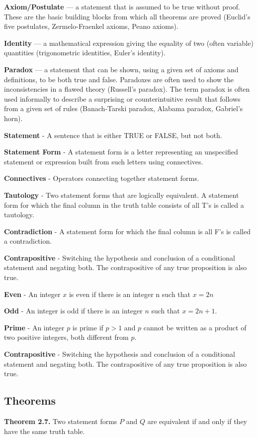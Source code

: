 \documentclass{article}
\begin{document}
\textbf{Axiom/Postulate} — a statement that is assumed to be true without proof. These are the basic building blocks from which all theorems are proved (Euclid’s five postulates, Zermelo-Fraenkel axioms, Peano axioms).

\textbf{Identity} — a mathematical expression giving the equality of two (often variable) quantities (trigonometric identities, Euler’s identity).

\textbf{Paradox} — a statement that can be shown, using a given set of axioms and definitions, to be both true and false. Paradoxes are often used to show the inconsistencies in a flawed theory (Russell’s paradox).  The term paradox is often used informally to describe a surprising or counterintuitive result that follows from a given set of rules (Banach-Tarski paradox, Alabama paradox, Gabriel’s horn).

\textbf{Statement} - A sentence that is either TRUE or FALSE, but not both.

\textbf{Statement Form} - A statement form is a letter representing an unspecified statement or expression built from such letters using connectives.

\textbf{Connectives} - Operators connecting together statement forms.

\textbf{Tautology} - Two statement forms that are logically equivalent. A statement form for which the final column in the truth table consists of all T's is called a tautology.

\textbf{Contradiction} - A statement form for which the final column is all F's is called a contradiction.

\textbf{Contrapositive} - Switching the hypothesis and conclusion of a conditional statement and negating both. The contrapositive of any true proposition is also true.

\textbf{Even} - An integer $x$ is even if there is an integer n such that $x=2n$

\textbf{Odd} - An integer is odd if there is an integer $n$ such that $x=2n+1$.

\textbf{Prime} - An integer $p$ is prime if $p>1$ and $p$ cannot be written as a product of two positive integers, both different from $p$.

\textbf{Contrapositive} - Switching the hypothesis and conclusion of a conditional statement and negating both. The contrapositive of any true proposition is also true.

\subsection{Theorems}
\textbf{Theorem 2.7.} 
Two statement forms $P$ and $Q$ are equivalent if and only if they have the same truth table.
\end{document}
